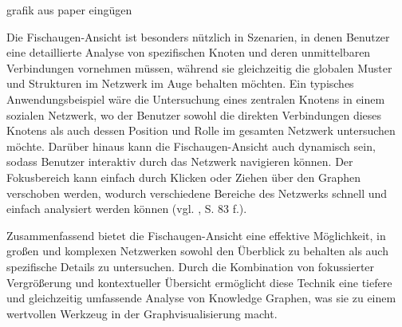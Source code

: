 grafik aus paper eingügen

Die Fischaugen-Ansicht ist besonders nützlich in Szenarien, in denen Benutzer eine detaillierte Analyse von spezifischen Knoten und deren unmittelbaren Verbindungen vornehmen müssen, während sie gleichzeitig die globalen Muster und Strukturen im Netzwerk im Auge behalten möchten. Ein typisches Anwendungsbeispiel wäre die Untersuchung eines zentralen Knotens in einem sozialen Netzwerk, wo der Benutzer sowohl die direkten Verbindungen dieses Knotens als auch dessen Position und Rolle im gesamten Netzwerk untersuchen möchte. Darüber hinaus kann die Fischaugen-Ansicht auch dynamisch sein, sodass Benutzer interaktiv durch das Netzwerk navigieren können. Der Fokusbereich kann einfach durch Klicken oder Ziehen über den Graphen verschoben werden, wodurch verschiedene Bereiche des Netzwerks schnell und einfach analysiert werden können (vgl. \cite{fisheye:Sarkar}, S. 83 f.).

Zusammenfassend bietet die Fischaugen-Ansicht eine effektive Möglichkeit, in großen und komplexen Netzwerken sowohl den Überblick zu behalten als auch spezifische Details zu untersuchen. Durch die Kombination von fokussierter Vergrößerung und kontextueller Übersicht ermöglicht diese Technik eine tiefere und gleichzeitig umfassende Analyse von Knowledge Graphen, was sie zu einem wertvollen Werkzeug in der Graphvisualisierung macht.